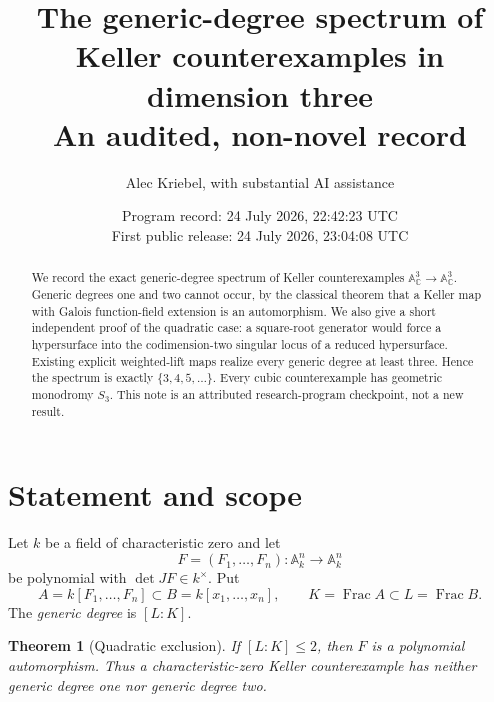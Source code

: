 \documentclass[11pt]{article}
\title{\bfseries The generic-degree spectrum of Keller
counterexamples in dimension three\\[3pt]
\large An audited, non-novel record}
\author{Alec Kriebel, with substantial AI assistance}
\date{Program record: 24 July 2026, 22:42:23 UTC\\
First public release: 24 July 2026, 23:04:08 UTC}
\newtheorem{theorem}{Theorem}
\theoremstyle{remark}
\newcommand{\A}{\mathbb A}
\newcommand{\C}{\mathbb C}
\newcommand{\Frac}{\operatorname{Frac}}
\begin{document}
\maketitle

\begin{center}
\end{center}

\begin{abstract}
We record the exact generic-degree spectrum of Keller counterexamples
$\A^3_\C\to\A^3_\C$.  Generic degrees one and two cannot occur, by the
classical theorem that a Keller map with Galois function-field extension is
an automorphism.  We also give a short independent proof of the quadratic
case: a square-root generator would force a hypersurface into the
codimension-two singular locus of a reduced hypersurface.  Existing explicit
weighted-lift maps realize every generic degree at least three.  Hence the
spectrum is exactly $\{3,4,5,\ldots\}$.  Every cubic counterexample has
geometric monodromy $S_3$.  This note is an attributed research-program
checkpoint, not a new result.
\end{abstract}

\section{Statement and scope}

Let $k$ be a field of characteristic zero and let
\[
 F=(F_1,\ldots,F_n):\A^n_k\longrightarrow\A^n_k
\]
be polynomial with $\det JF\in k^\times$.  Put
\[
 A=k[F_1,\ldots,F_n]\subset B=k[x_1,\ldots,x_n],\qquad
 K=\Frac A\subset L=\Frac B.
\]
The \emph{generic degree} is $[L:K]$.

\begin{theorem}[Quadratic exclusion]\label{thm:quadratic}
If $[L:K]\leq2$, then $F$ is a polynomial automorphism.  Thus a
characteristic-zero Keller counterexample has neither generic degree one nor
generic degree two.
\end{theorem}
\end{document}
